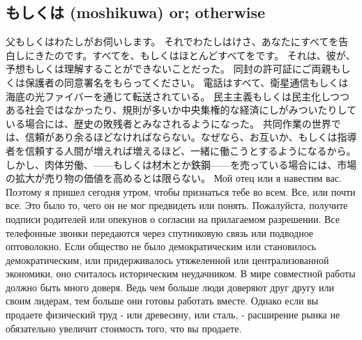 \subsection{もしくは (moshikuwa) or; otherwise}

父もしくはわたしがお伺いします。
それでわたしはけさ、あなたにすべてを告白しにきたのです。すべてを、もしくはほとんどすべてをです。
それは、彼が、予想もしくは理解することができないことだった。
同封の許可証にご両親もしくは保護者の同意署名をもらってください。
電話はすべて、衛星通信もしくは海底の光ファイバーを通じて転送されている。
民主主義もしくは民主化しつつある社会ではなかったり、規則が多いか中央集権的な経済にしがみついたりしている場合には、歴史の敗残者とみなされるようになった。
共同作業の世界では、信頼があり余るほどなければならない。なぜなら、お互いか、もしくは指導者を信頼する人間が増えれば増えるほど、一緒に働こうとするようになるから。
しかし、肉体労働、——もしくは材木とか鉄鋼——を売っている場合には、市場の拡大が売り物の価値を高めるとは限らない。
Мой отец или я навестим вас.
Поэтому я пришел сегодня утром, чтобы признаться тебе во всем. Все, или почти все.
Это было то, чего он не мог предвидеть или понять.
Пожалуйста, получите подписи родителей или опекунов о согласии на прилагаемом разрешении.
Все телефонные звонки передаются через спутниковую связь или подводное оптоволокно.
Если общество не было демократическим или становилось демократическим, или придерживалось утяжеленной или централизованной экономики, оно считалось историческим неудачником.
В мире совместной работы должно быть много доверя. Ведь чем больше люди доверяют друг другу или своим лидерам, тем больше они готовы работать вместе.
Однако если вы продаете физический труд - или древесину, или сталь, - расширение рынка не обязательно увеличит стоимость того, что вы продаете.